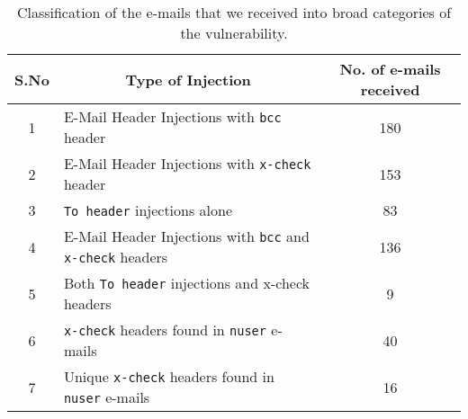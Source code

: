 \begin{table}[tbp]
	\centering
	\begin{tabular}{|c|l|c|}
		\hline
		\multicolumn{1}{|c|}{\textbf{S.No}} &
		\multicolumn{1}{c|}{\textbf{Type of Injection}} &
		\multicolumn{1}{p{3cm}|}{\centering \textbf{No. of e-mails received}}\\
		\hline
		1 & E-Mail Header Injections with \texttt{bcc} header & 180\\
		\hline
		2 & E-Mail Header Injections with \texttt{x-check} header & 153\\
		\hline
		3 & \texttt{To header} injections alone & 83\\
		\hline
		4 & E-Mail Header Injections with \texttt{bcc} and \texttt{x-check} headers & 136\\
		\hline
		5 & Both \texttt{To header} injections and x-check headers & 9\\
		\hline
		6 & \texttt{x-check} headers found in \texttt{nuser} e-mails & 40\\
		\hline
		7 & Unique \texttt{x-check} headers found in \texttt{nuser} e-mails & 16\\
		\hline
	\end{tabular}
	\caption[]{Classification of the e-mails that we received into broad categories of the vulnerability.}
	\label{tab:analysis}
\end{table}
